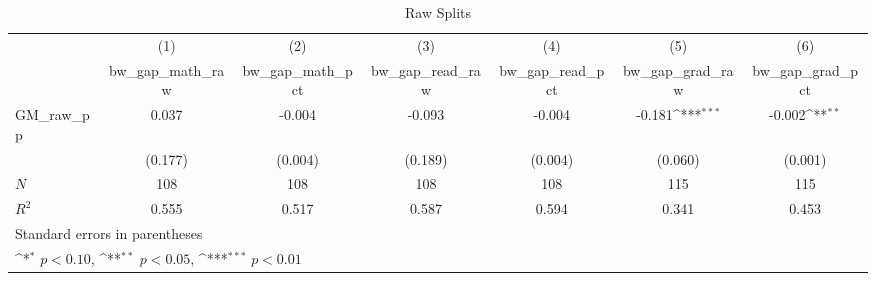\begin{table}[htbp]\centering
\def\sym#1{\ifmmode^{#1}\else\(^{#1}\)\fi}
\caption{Raw Splits}
\begin{tabular}{l*{6}{c}}
\hline\hline
            &\multicolumn{1}{c}{(1)}&\multicolumn{1}{c}{(2)}&\multicolumn{1}{c}{(3)}&\multicolumn{1}{c}{(4)}&\multicolumn{1}{c}{(5)}&\multicolumn{1}{c}{(6)}\\
            &\multicolumn{1}{c}{bw\_gap\_math\_raw}&\multicolumn{1}{c}{bw\_gap\_math\_pct}&\multicolumn{1}{c}{bw\_gap\_read\_raw}&\multicolumn{1}{c}{bw\_gap\_read\_pct}&\multicolumn{1}{c}{bw\_gap\_grad\_raw}&\multicolumn{1}{c}{bw\_gap\_grad\_pct}\\
\hline
GM\_raw\_pp   &       0.037         &      -0.004         &      -0.093         &      -0.004         &      -0.181\sym{***}&      -0.002\sym{**} \\
            &     (0.177)         &     (0.004)         &     (0.189)         &     (0.004)         &     (0.060)         &     (0.001)         \\
\hline
\(N\)       &         108         &         108         &         108         &         108         &         115         &         115         \\
\(R^{2}\)   &       0.555         &       0.517         &       0.587         &       0.594         &       0.341         &       0.453         \\
\hline\hline
\multicolumn{7}{l}{\footnotesize Standard errors in parentheses}\\
\multicolumn{7}{l}{\footnotesize \sym{*} \(p<0.10\), \sym{**} \(p<0.05\), \sym{***} \(p<0.01\)}\\
\end{tabular}
\end{table}
